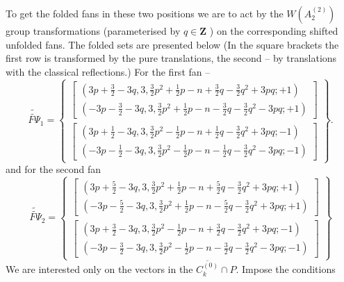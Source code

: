\documentclass{article}
\begin{document}
To get the folded fans in these two positions we are to act by the $W\left(
A_{2}^{\left( 2\right) }\right) $ group transformations (parameterised by $%
q\in \mathbf{Z}$ ) on the corresponding shifted unfolded fans. The folded
sets are presented below (In the square brackets the first row is
transformed by the pure translations, the second -- by translations with the
classical reflections.) For the first fan --
\begin{equation*}
\widetilde{\widetilde{F\Psi }}_{1}=\left\{
\begin{array}{c}
\left[
\begin{array}{c}
\left( 3p+\frac{3}{2}-3q,3,\frac{3}{2}p^{2}+\frac{1}{2}p-n+\frac{3}{2}q-%
\frac{3}{2}q^{2}+3pq;+1\right)  \\
\left( -3p-\frac{3}{2}-3q,3,\frac{3}{2}p^{2}+\frac{1}{2}p-n-\frac{3}{2}q-%
\frac{3}{2}q^{2}-3pq;+1\right)
\end{array}
\right]  \\
\left[
\begin{array}{c}
\left( 3p+\frac{1}{2}-3q,3,\frac{3}{2}p^{2}-\frac{1}{2}p-n+\frac{1}{2}q-%
\frac{3}{2}q^{2}+3pq;-1\right)  \\
\left( -3p-\frac{1}{2}-3q,3,\frac{3}{2}p^{2}-\frac{1}{2}p-n-\frac{1}{2}q-%
\frac{3}{2}q^{2}-3pq;-1\right)
\end{array}
\right]
\end{array}
\right\} .
\end{equation*}
and for the second fan
\begin{equation*}
\widetilde{\widetilde{F\Psi }}_{2}=\left\{
\begin{array}{c}
\left[
\begin{array}{c}
\left( 3p+\frac{5}{2}-3q,3,\frac{3}{2}p^{2}+\frac{1}{2}p-n+\frac{5}{2}q-%
\frac{3}{2}q^{2}+3pq;+1\right)  \\
\left( -3p-\frac{5}{2}-3q,3,\frac{3}{2}p^{2}+\frac{1}{2}p-n-\frac{5}{2}q-%
\frac{3}{2}q^{2}+3pq;+1\right)
\end{array}
\right]  \\
\left[
\begin{array}{c}
\left( 3p+\frac{3}{2}-3q,3,\frac{3}{2}p^{2}-\frac{1}{2}p-n+\frac{3}{2}q-%
\frac{3}{2}q^{2}+3pq;-1\right)  \\
\left( -3p-\frac{3}{2}-3q,3,\frac{3}{2}p^{2}-\frac{1}{2}p-n-\frac{3}{2}q-%
\frac{3}{2}q^{2}-3pq;-1\right)
\end{array}
\right]
\end{array}
\right\}
\end{equation*}
We are interested only on the vectors in the $\overline{C_{k}^{\left(
0\right) }}\cap P.$ Impose the conditions
\end{document}
